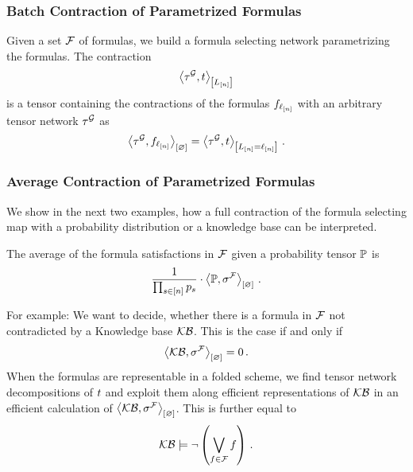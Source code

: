 \subsubsection{Batch Contraction of Parametrized Formulas}

Given a set $\mathcal{F}$ of formulas, we build a formula selecting network parametrizing the formulas.
The contraction
\begin{align*}
    \left\langle \tau^{\mathcal{G}},t\right\rangle_{\left[ L_{[n]} \right]}
\end{align*}
is a tensor containing the contractions of the formulas $f_{\ell_{[n]}}$ with an arbitrary tensor network $\tau^{\mathcal{G}}$ as
\begin{align*}
    \left\langle \tau^{\mathcal{G}},f_{\ell_{[n]}}\right\rangle_{\left[ \varnothing \right]} = \left\langle \tau^{\mathcal{G}},t\right\rangle_{\left[ L_{[n]}=\ell_{[n]} \right]} \, .
\end{align*}


\subsubsection{Average Contraction of Parametrized Formulas}

We show in the next two examples, how a full contraction of the formula selecting map with a probability distribution or a knowledge base can be interpreted.

\begin{example}
    The average of the formula satisfactions in $\mathcal{F}$ given a probability tensor $\mathbb{P}$ is
    \[ \frac{1}{\prod_{s\in[n]}p_{s}} \cdot \left\langle \mathbb{P},\sigma^{\mathcal{F}}\right\rangle_{\left[ \varnothing \right]} \, . \]
\end{example}


\begin{example}
    For example: We want to decide, whether there is a formula in $\mathcal{F}$ not contradicted by a Knowledge base $\mathcal{KB}$.
    This is the case if and only if
    \[ \left\langle \mathcal{KB},\sigma^{\mathcal{F}}\right\rangle_{\left[ \varnothing \right]} = 0 \, .  \]
    When the formulas are representable in a folded scheme, we find tensor network decompositions of $t$ and exploit them along efficient representations of $\mathcal{KB}$ in an efficient calculation of $\left\langle \mathcal{KB},\sigma^{\mathcal{F}}\right\rangle_{\left[ \varnothing \right]} $.
    This is further equal to
    \[ \mathcal{KB} \models \lnot \left( \bigvee_{f\in\mathcal{F}} f\right) \, . \]
\end{example}
